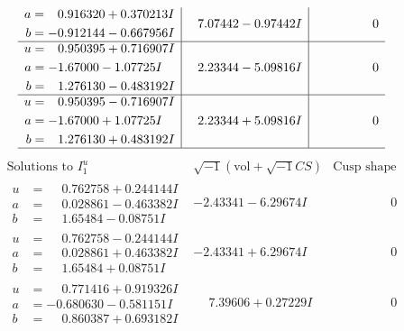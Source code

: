 \documentclass[1p]{elsarticle_modified}
\theoremstyle{definition}
\newcommand{\I}{\sqrt{-1}}
\begin{document}
$$\begin{array}{c|c|c}
\begin{aligned}
a &= \phantom{-}0.916320 + 0.370213 I \\
b &= -0.912144 - 0.667956 I\end{aligned}
 & \phantom{-}7.07442 - 0.97442 I & \phantom{-0.000000 } 0 \\ \hline\begin{aligned}
u &= \phantom{-}0.950395 + 0.716907 I \\
a &= -1.67000 - 1.07725 I \\
b &= \phantom{-}1.276130 - 0.483192 I\end{aligned}
 & \phantom{-}2.23344 - 5.09816 I & \phantom{-0.000000 } 0 \\ \hline\begin{aligned}
u &= \phantom{-}0.950395 - 0.716907 I \\
a &= -1.67000 + 1.07725 I \\
b &= \phantom{-}1.276130 + 0.483192 I\end{aligned}
 & \phantom{-}2.23344 + 5.09816 I & \phantom{-0.000000 } 0\\
 \hline 
 \end{array}$$\newpage$$\begin{array}{c|c|c}  
\text{Solutions to }I^u_{1}& \I (\text{vol} + \sqrt{-1}CS) & \text{Cusp shape}\\
 \hline 
\begin{aligned}
u &= \phantom{-}0.762758 + 0.244144 I \\
a &= \phantom{-}0.028861 - 0.463382 I \\
b &= \phantom{-}1.65484 - 0.08751 I\end{aligned}
 & -2.43341 - 6.29674 I & \phantom{-0.000000 } 0 \\ \hline\begin{aligned}
u &= \phantom{-}0.762758 - 0.244144 I \\
a &= \phantom{-}0.028861 + 0.463382 I \\
b &= \phantom{-}1.65484 + 0.08751 I\end{aligned}
 & -2.43341 + 6.29674 I & \phantom{-0.000000 } 0 \\ \hline\begin{aligned}
u &= \phantom{-}0.771416 + 0.919326 I \\
a &= -0.680630 - 0.581151 I \\
b &= \phantom{-}0.860387 + 0.693182 I\end{aligned}
 & \phantom{-}7.39606 + 0.27229 I & \phantom{-0.000000 } 0 \\ \hline\begin{aligned}

\end{aligned}
\end{array}$$
\end{document}
